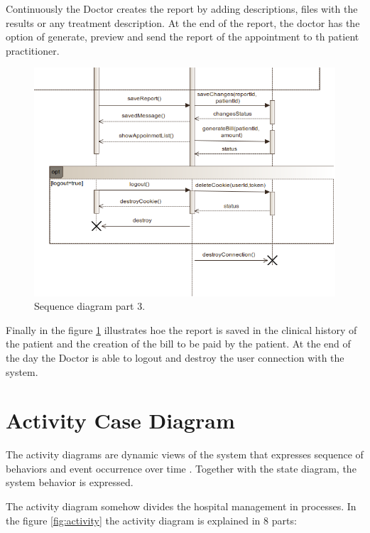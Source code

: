 \documentclass{article}
\begin{document}
            Continuously the Doctor creates the report by adding descriptions, files with the results or any treatment description. At the end of the report, the doctor has the option of generate, preview and send the report of the appointment to
            th patient practitioner.

            \begin{figure}[H]
                \centering 
                \includegraphics[width=1\linewidth]{./img/seq3.png}
                \caption{Sequence diagram part 3.}
                \label{fig:sequence3}
            \end{figure}

            Finally in the figure \ref{fig:sequence3} illustrates hoe the report is saved in the clinical history of the patient and the creation of the bill to be paid by the patient.
            At the end of the day the Doctor is able to logout and destroy the user connection with the system.

            \section{Activity Case Diagram} 

            The activity diagrams are dynamic views of the system that expresses sequence of
            behaviors and event occurrence over time \cite{sysml}. Together
            with the state diagram, the system behavior is expressed.

            The activity diagram  somehow divides the hospital management in processes. In the figure \ref{fig:activity} the activity diagram is explained in 8 parts:
\end{document}
